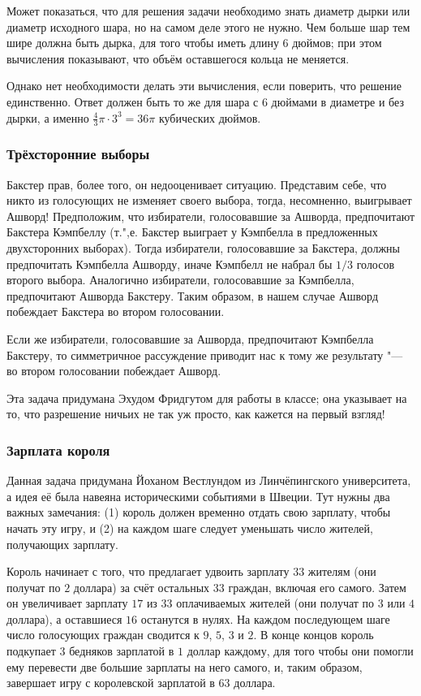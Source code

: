 \documentclass[twoside]{book}
\begin{document}
Может показаться, что для решения задачи необходимо знать диаметр дырки или диаметр исходного шара, но на самом деле этого не нужно.
Чем больше шар тем шире должна быть дырка, для того чтобы иметь длину 6 дюймов;
при этом вычисления показывают, что объём оставшегося кольца не меняется.

Однако нет необходимости делать эти вычисления, если поверить, что решение единственно.
Ответ должен быть то же для шара с 6 дюймами в диаметре и без дырки, а именно $\tfrac43 \pi \cdot 3^3=36\pi$ кубических дюймов.

\subsubsection*{Трёхсторонние выборы}%

Бакстер прав, более того, он недооценивает ситуацию.
Представим себе, что никто из голосующих не изменяет своего выбора, тогда, несомненно, выигрывает Ашворд!
Предположим, что избиратели, голосовавшие за Ашворда, предпочитают Бакстера Кэмпбеллу (т.",е. Бакстер выиграет у Кэмпбелла в предложенных двухсторонних выборах).
Тогда избиратели, голосовавшие за Бакстера, должны предпочитать
Кэмпбелла Ашворду, иначе Кэмпбелл не набрал бы $1/3$ голосов второго выбора.
Аналогично избиратели, голосовавшие за Кэмпбелла, предпочитают Ашворда
Бакстеру.
Таким образом, в нашем случае Ашворд побеждает Бакстера во втором
голосовании.

Если же избиратели, голосовавшие за Ашворда, предпочитают Кэмпбелла Бакстеру, то симметричное рассуждение приводит нас к тому же результату "--- во втором голосовании побеждает Ашворд.
\heart

Эта задача придумана Эхудом Фридгутом %
для работы в классе;
она указывает на то, что разрешение ничьих не так уж просто, как кажется на первый взгляд!

\subsubsection*{Зарплата короля}%

Данная задача придумана Йоханом Вестлундом %
из Линчёпингского университета, а идея её была навеяна историческими событиями в Швеции.
Тут нужны два важных замечания: (1) король должен временно отдать свою зарплату, чтобы начать эту игру, и (2) на каждом шаге следует уменьшать число жителей, получающих зарплату.

Король начинает с того, что предлагает удвоить зарплату $33$ жителям (они получат по $2$ доллара) за счёт остальных $33$ граждан, включая его самого.
Затем он увеличивает зарплату $17$ из $33$ оплачиваемых жителей (они получат по $3$ или $4$ доллара), а оставшиеся $16$ останутся в нулях.
На каждом последующем шаге число голосующих граждан сводится к $9$, $5$, $3$ и $2$.
В конце концов король подкупает $3$ бедняков зарплатой в $1$ доллар каждому, для того чтобы они помогли ему перевести две большие зарплаты на него самого, и, таким образом, завершает игру с королевской зарплатой в $63$ доллара.
\end{document}
